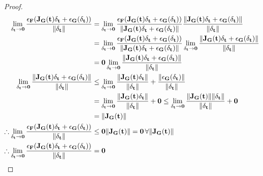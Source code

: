 \begin{lemma}
\begin{proof}
        \begin{align*}
            \lim_{\delta_\vec{t}\rightarrow\vec{0}}\frac{\epsilon_\fatf(\jacobian_\vec{G}(\vec{t})\delta_\vec{t}+\epsilon_\vec{G}(\delta_\vec{t}))}{\lVert\delta_\vec{t}\rVert}&=\lim_{\delta_\vec{t}\rightarrow\vec{0}}\frac{\epsilon_\fatf(\jacobian_\vec{G}(\vec{t})\delta_\vec{t}+\epsilon_\vec{G}(\delta_\vec{t}))}{\lVert\jacobian_\vec{G}(\vec{t})\delta_\vec{t}+\epsilon_\vec{G}(\delta_\vec{t})\rVert}\frac{\lVert\jacobian_\vec{G}(\vec{t})\delta_\vec{t}+\epsilon_\vec{G}(\delta_\vec{t})\rVert}{\lVert\delta_\vec{t}\rVert}\\
            &=\lim_{\delta_\vec{t}\rightarrow\vec{0}}\frac{\epsilon_\fatf(\jacobian_\vec{G}(\vec{t})\delta_\vec{t}+\epsilon_\vec{G}(\delta_\vec{t}))}{\lVert\jacobian_\vec{G}(\vec{t})\delta_\vec{t}+\epsilon_\vec{G}(\delta_\vec{t})\rVert}\lim_{\delta_\vec{t}\rightarrow\vec{0}}\frac{\lVert\jacobian_\vec{G}(\vec{t})\delta_\vec{t}+\epsilon_\vec{G}(\delta_\vec{t})\rVert}{\lVert\delta_\vec{t}\rVert}\\
            &=\vec{0}\lim_{\delta_\vec{t}\rightarrow\vec{0}}\frac{\lVert\jacobian_\vec{G}(\vec{t})\delta_\vec{t}+\epsilon_\vec{G}(\delta_\vec{t})\rVert}{\lVert\delta_\vec{t}\rVert}\\
            \lim_{\delta_\vec{t}\rightarrow\vec{0}}\frac{\lVert\jacobian_\vec{G}(\vec{t})\delta_\vec{t}+\epsilon_\vec{G}(\delta_\vec{t})\rVert}{\lVert\delta_\vec{t}\rVert}&\leq\lim_{\delta_\vec{t}\rightarrow\vec{0}}\frac{\lVert\jacobian_\vec{G}(\vec{t})\delta_\vec{t}\rVert}{\lVert\delta_\vec{t}\rVert}+\frac{\lVert\epsilon_\vec{G}(\delta_\vec{t})\rVert}{\lVert\delta_\vec{t}\rVert}\\
            &=\lim_{\delta_\vec{t}\rightarrow\vec{0}}\frac{\lVert\jacobian_\vec{G}(\vec{t})\delta_\vec{t}\rVert}{\lVert\delta_\vec{t}\rVert}+\vec{0}\leq\lim_{\delta_\vec{t}\rightarrow\vec{0}}\frac{\lVert\jacobian_\vec{G}(\vec{t})\rVert\lVert\delta_\vec{t}\rVert}{\lVert\delta_\vec{t}\rVert}+\vec{0}\\
            &=\lVert\jacobian_\vec{G}(\vec{t})\rVert\\
            \therefore\lim_{\delta_\vec{t}\rightarrow\vec{0}}\frac{\epsilon_\fatf(\jacobian_\vec{G}(\vec{t})\delta_\vec{t}+\epsilon_\vec{G}(\delta_\vec{t}))}{\lVert\delta_\vec{t}\rVert}&\leq\vec{0}\lVert\jacobian_\vec{G}(\vec{t})\rVert=\vec{0}\,\forall\lVert\jacobian_\vec{G}(\vec{t})\rVert\\
            \therefore\lim_{\delta_\vec{t}\rightarrow\vec{0}}\frac{\epsilon_\fatf(\jacobian_\vec{G}(\vec{t})\delta_\vec{t}+\epsilon_\vec{G}(\delta_\vec{t}))}{\lVert\delta_\vec{t}\rVert}&=\vec{0}

\end{align*}
\end{proof}
\end{lemma}
